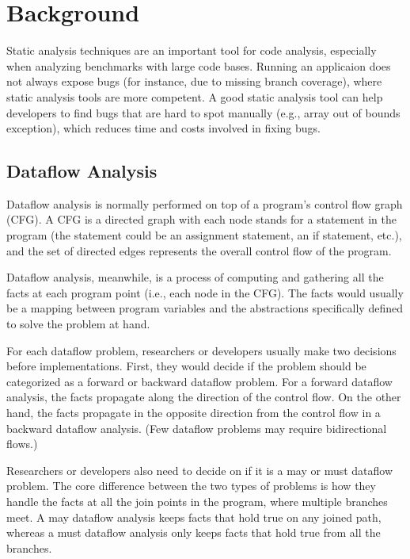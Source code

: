 \chapter{Background}
\label{chap:background}

Static analysis techniques are an important tool for code analysis, especially when analyzing benchmarks with large code bases. Running an applicaion does not always expose bugs (for instance, due to missing branch coverage), where static analysis tools are more competent. A good static analysis tool can help developers to find bugs that are hard to spot manually (e.g., array out of bounds exception), which reduces time and costs involved in fixing bugs. 

\section{Dataflow Analysis}

Dataflow analysis is normally performed on top of a program's control flow graph (CFG). A CFG is a directed graph with each node stands for a statement in the program (the statement could be an assignment statement, an if statement, etc.), and the set of directed edges represents the overall control flow of the program.

Dataflow analysis, meanwhile, is a process of computing and gathering all the facts at each program point (i.e., each node in the CFG). The facts would usually be a mapping between program variables and the abstractions specifically defined to solve the problem at hand. 

For each dataflow problem, researchers or developers usually make two decisions before implementations. First, they would decide if the problem should be categorized as a forward or backward dataflow problem. For a forward dataflow analysis, the facts propagate along the direction of the control flow. On the other hand, the facts propagate in the opposite direction from the control flow in a backward dataflow analysis. (Few dataflow problems may require bidirectional flows.)

Researchers or developers also need to decide on if it is a may or must dataflow problem. The core difference between the two types of problems is how they handle the facts at all the join points in the program, where multiple branches meet. A may dataflow analysis keeps facts that hold true on any joined path, whereas a must dataflow analysis only keeps facts that hold true from all the branches.

